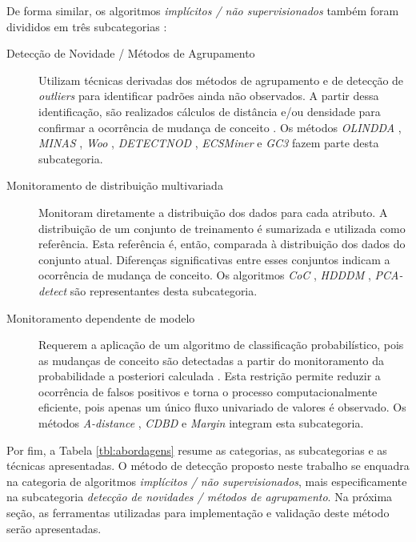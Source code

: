 \documentclass[msc, classic, a4paper]{ufbathesis}
\begin{document}
De forma similar, os algoritmos \textit{implícitos / não supervisionados} também foram divididos em três subcategorias \cite{GONCALVES20148144}:

\begin{description}
    \item[Detecção de Novidade / Métodos de Agrupamento]
    Utilizam técnicas derivadas dos métodos de agrupamento e de detecção de \textit{outliers} para identificar padrões ainda não observados.
    A partir dessa identificação, são realizados cálculos de distância e/ou densidade para confirmar a ocorrência de mudança de conceito \cite{Ryu:Kantardzic:2012}.
    Os métodos
    \textit{OLINDDA} \cite{Spinosa:2007:OCA:1244002.1244107},
    \textit{MINAS} \cite{Faria:2013:NDA:2480362.2480515},
    \textit{Woo} \cite{Ryu:Kantardzic:2012},
    \textit{DETECTNOD} \cite{Hashemi:Hayat:DETECTNOD:2010},
    \textit{ECSMiner} \cite{Masud:2011:CNC:1978259.1978529} e
    \textit{GC3} \cite{Sethi2016b:GC3} fazem parte desta subcategoria.

    \item[Monitoramento de distribuição multivariada]
    Monitoram diretamente a distribuição dos dados para cada atributo.
    A distribuição de um conjunto de treinamento é sumarizada e utilizada como referência.
    Esta referência é, então, comparada à distribuição dos dados do conjunto atual.
    Diferenças significativas entre esses conjuntos indicam a ocorrência de mudança de conceito.
    Os algoritmos
    \textit{CoC} \cite{Lee:Magoules:CoC:2012},
    \textit{HDDDM} \cite{Ditzler:Polikar:HDDDM:2011},
    \textit{PCA-detect} \cite{Kuncheva:PCADetect:20085}
    são representantes desta subcategoria.

    \item[Monitoramento dependente de modelo]
    Requerem a aplicação de um algoritmo de classificação probabilístico,
    pois as mudanças de conceito são detectadas a partir do monitoramento da probabilidade a posteriori calculada \cite{Zliobaite:2010}.
    Esta restrição permite reduzir a ocorrência de falsos positivos e torna o processo computacionalmente eficiente, pois apenas um único fluxo univariado de valores é observado.
    Os métodos
    \textit{A-distance} \cite{Dredze:ADistance:2010585},
    \textit{CDBD} \cite{Lindstrom:CDBD:2013} e
    \textit{Margin} \cite{Dries:Margin:2009} integram esta subcategoria.
\end{description}

Por fim, a Tabela \ref{tbl:abordagens} resume as categorias, as subcategorias e as técnicas apresentadas.
O método de detecção proposto neste trabalho se enquadra na categoria de algoritmos \textit{implícitos / não supervisionados}, mais especificamente na subcategoria \textit{detecção de novidades / métodos de agrupamento}.
Na próxima seção, as ferramentas utilizadas para implementação e validação deste método serão apresentadas.
\end{document}
